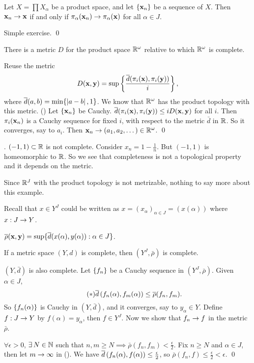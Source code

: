 \rmk {} Let \(X = \prod X_\alpha\) be a product space, and let \(\seq{\bf{x}_n}\) be a sequence of \(X\). Then \(\bf{x}_n \ra \bf{x}\) if and only if \(\pi_\alpha(\bf{x}_n) \ra \pi_\alpha(\bf{x})\) for all \(\alpha \in J\).

\pf Simple exercise. \qed

 There is a metric \(D\) for the product space \(\R^\omega\) relative to which \(\R^\omega\) is complete.

\pf Reuse the metric
\[
    D(\bf{x}, \bf{y}) = \sup \left\{ \frac{\bar{d}(\pi_i (\bf{x}), \pi_i(\bf{y}))}{i}\right\},
\]
where \(\bar{d}(a, b) = \min\{\abs{a - b}, 1\}\). We know that \(\R^\omega\) has the product topology with this metric. () Let \(\seq{\bf{x}_n}\) be Cauchy. \(\bar{d}(\pi_i(\bf{x}), \pi_i(\bf{y})) \leq i D(\bf{x}, \bf{y})\) for all \(i\). Then \(\pi_i(\bf{x}_n)\) is a Cauchy sequence for fixed \(i\), with respect to the metric \(\bar{d}\) in \(\R\). So it converges, say to \(a_i\). Then \(\bf{x}_n \ra (a_1, a_2, \dots) \in \R^\omega\). \qed

\ex. \((-1, 1) \subset \R\) is not complete. Consider \(x_n = 1 - \frac{1}{n}\). But \((-1, 1)\) is homeomorphic to \(\R\). So we see that completeness is not a topological property and it depends on the metric.

Since \(\R^J\) with the product topology is not metrizable, nothing to say more about this example.

\notation Recall that \(x \in Y^J\) could be written as \(x = (x_\alpha)_{\alpha \in J} = (x(\alpha))\) where \(x : J \ra Y\).

\recall \(\bar{\rho}(\bf{x}, \bf{y}) = \sup\{\bar{d}(x(\alpha), y(\alpha)) : \alpha \in J\}\).

 If a metric space \((Y, d)\) is complete, then \((Y^J, \bar{\rho})\) is complete.

\pf \((Y, \bar{d})\) is also complete. Let \(\seq{f_n}\) be a Cauchy sequence in \((Y^J, \bar{\rho})\). Given \(\alpha \in J\),
\[ \tag{\mast}
    \bar{d}\paren{f_n(\alpha), f_m(\alpha)} \leq \bar{\rho}(f_n, f_m).
\]
So \(\seq{f_n(\alpha)}\) is Cauchy in \((Y, \bar{d})\), and it converges, say to \(y_\alpha \in Y\). Define \(f : J \ra Y\) by \(f(\alpha) = y_\alpha\), then \(f \in Y^J\). Now we show that \(f_n \ra f\) in the metric \(\bar{\rho}\).

\(\forall \epsilon > 0\), \(\exists N \in \N\) such that \(n,m \geq N \implies \bar{\rho}(f_n, f_m) < \frac{\epsilon}{2}\). Fix \(n \geq N\) and \(\alpha \in J\), then let \(m \ra \infty\) in (\mast). We have \(\bar{d}\paren{f_n(\alpha), f(\alpha)} \leq \frac{\epsilon}{2}\), so \(\bar{\rho}(f_n, f) \leq \frac{\epsilon}{2} < \epsilon\). \qed
